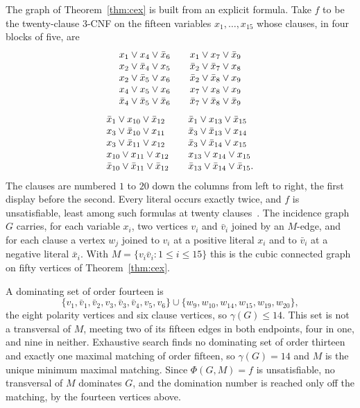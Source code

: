 \documentclass[11pt]{article}
\theoremstyle{definition}
\theoremstyle{remark}
\begin{document}
The graph of Theorem~\ref{thm:cex} is built from an explicit formula. Take $f$ to
be the twenty-clause $3$-CNF on the fifteen variables $x_1, \dots, x_{15}$ whose
clauses, in four blocks of five, are
\[
\begin{array}{@{}l@{\qquad}l@{}}
x_1 \vee x_4 \vee \bar{x}_6 & x_1 \vee x_7 \vee \bar{x}_9 \\
x_2 \vee \bar{x}_4 \vee x_5 & \bar{x}_2 \vee \bar{x}_7 \vee x_8 \\
x_2 \vee \bar{x}_5 \vee x_6 & \bar{x}_2 \vee \bar{x}_8 \vee x_9 \\
x_4 \vee x_5 \vee x_6 & x_7 \vee x_8 \vee x_9 \\
\bar{x}_4 \vee \bar{x}_5 \vee \bar{x}_6 & \bar{x}_7 \vee \bar{x}_8 \vee \bar{x}_9
\end{array}
\]
\[
\begin{array}{@{}l@{\qquad}l@{}}
\bar{x}_1 \vee x_{10} \vee \bar{x}_{12} & \bar{x}_1 \vee x_{13} \vee \bar{x}_{15} \\
x_3 \vee \bar{x}_{10} \vee x_{11} & \bar{x}_3 \vee \bar{x}_{13} \vee x_{14} \\
x_3 \vee \bar{x}_{11} \vee x_{12} & \bar{x}_3 \vee \bar{x}_{14} \vee x_{15} \\
x_{10} \vee x_{11} \vee x_{12} & x_{13} \vee x_{14} \vee x_{15} \\
\bar{x}_{10} \vee \bar{x}_{11} \vee \bar{x}_{12} & \bar{x}_{13} \vee \bar{x}_{14} \vee \bar{x}_{15} .
\end{array}
\]
The clauses are numbered $1$ to $20$ down the columns from left to right, the
first display before the second. Every literal occurs exactly twice, and $f$ is
unsatisfiable, least among such
formulas at twenty clauses~\cite{ZhangPeitlSzeider2024}. The incidence graph $G$
carries, for each variable $x_i$, two vertices $v_i$ and $\bar{v}_i$ joined by an
$M$-edge, and for each clause a vertex $w_j$ joined to $v_i$ at a positive literal
$x_i$ and to $\bar{v}_i$ at a negative literal $\bar{x}_i$. With $M = \{v_i
\bar{v}_i : 1 \le i \le 15\}$ this is the cubic connected graph on fifty vertices
of Theorem~\ref{thm:cex}.

A dominating set of order fourteen is
\[
\{v_1, \bar{v}_1, \bar{v}_2, v_3, \bar{v}_3, \bar{v}_4, v_5, v_6\} \cup
\{w_9, w_{10}, w_{14}, w_{15}, w_{19}, w_{20}\},
\]
the eight polarity vertices and six clause vertices, so $\gamma(G) \le 14$. This
set is not a transversal of $M$, meeting two of its fifteen edges in both
endpoints, four in one, and nine in neither. Exhaustive search finds no dominating
set of order thirteen and exactly one maximal matching of order fifteen, so
$\gamma(G) = 14$ and $M$ is the unique minimum maximal matching. Since $\Phi(G, M)
= f$ is unsatisfiable, no transversal of $M$ dominates $G$, and the domination
number is reached only off the matching, by the fourteen vertices above.



\end{document}
